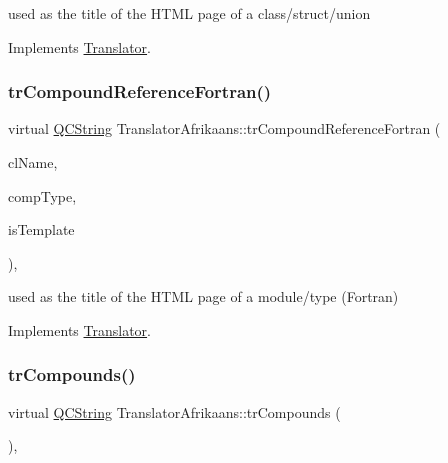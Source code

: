 used as the title of the H\+T\+ML page of a class/struct/union 

Implements \mbox{\hyperlink{class_translator}{Translator}}.

\mbox{\label{class_translator_afrikaans_ad2ca8ee587ace946fa2a6345f60b7abb}} 
\subsubsection{\texorpdfstring{trCompoundReferenceFortran()}{trCompoundReferenceFortran()}}
{\footnotesize\ttfamily virtual \mbox{\hyperlink{class_q_c_string}{Q\+C\+String}} Translator\+Afrikaans\+::tr\+Compound\+Reference\+Fortran (\begin{DoxyParamCaption}\item[{const char $\ast$}]{cl\+Name,  }\item[{\mbox{\hyperlink{class_class_def_ae70cf86d35fe954a94c566fbcfc87939}{Class\+Def\+::\+Compound\+Type}}}]{comp\+Type,  }\item[{bool}]{is\+Template }\end{DoxyParamCaption})\hspace{0.3cm}{\ttfamily [inline]}, {\ttfamily [virtual]}}

used as the title of the H\+T\+ML page of a module/type (Fortran) 

Implements \mbox{\hyperlink{class_translator}{Translator}}.

\mbox{\label{class_translator_afrikaans_ad16c5ff09b1db0e4cb8a7f6806b4c73d}} 
\subsubsection{\texorpdfstring{trCompounds()}{trCompounds()}}
{\footnotesize\ttfamily virtual \mbox{\hyperlink{class_q_c_string}{Q\+C\+String}} Translator\+Afrikaans\+::tr\+Compounds (\begin{DoxyParamCaption}{ }\end{DoxyParamCaption})\hspace{0.3cm}{\ttfamily [inline]}, {\ttfamily [virtual]}}

